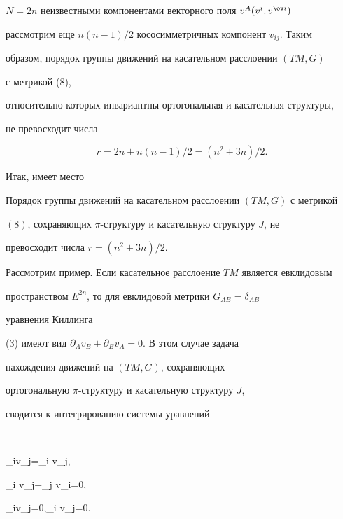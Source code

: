 $N=2n$ неизвестными компонентами векторного поля $v^A(v^i,v^{\ov i})$


рассмотрим еще $n(n-1)/2$ кососимметричных компонент $v_{ij}$. Таким


образом, порядок группы движений на касательном расслоении $(TM,G)$


с метрикой (8),


относительно которых инвариантны ортогональная и касательная структуры,


не превосходит числа


\begin{equation}


r=2n+n(n-1)/2=(n^2+3n)/2.


\end{equation}





Итак, имеет место





\begin{thm}


Порядок группы движений на касательном расслоении $(TM,G)$ с метрикой


$(8)$, сохраняющих $\pi$-структуру и касательную структуру $J$, не


превосходит числа $r=(n^2+3n)/2$.


\end{thm}





Рассмотрим пример. Если касательное расслоение $TM$ является евклидовым


пространством $E^{2n}$, то для евклидовой метрики $G_{AB}=\delta_{AB}$


уравнения Киллинга


(3) имеют вид $\partial_A v_B+\partial_B v_A=0$. В этом случае задача


нахождения движений на $(TM,G)$, сохраняющих


ортогональную $\pi$-структуру и касательную структуру $J$,


сводится к интегрированию системы уравнений


$$


\partial_{\ov i}v_{\ov j}=\partial_i v_j,\quad


\partial_i v_j+\partial_j v_i=0,\quad


\partial_{\ov i}v_j=0,\quad \partial_i v_{\ov j}=0.


